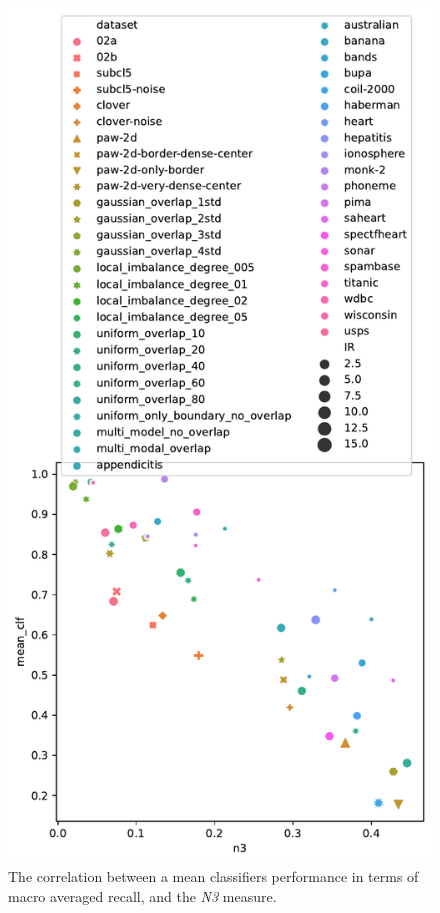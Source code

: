 \begin{figure}[tb]
\centering
\includegraphics[width=0.8\columnwidth]{plots/dataset_plots/siam_full_plot_n3.pdf}
\caption{The correlation between a mean classifiers performance in terms of macro averaged recall, and the \emph{N3} measure.}
\label{fig:n3_dataset_plot}
\end{figure}

